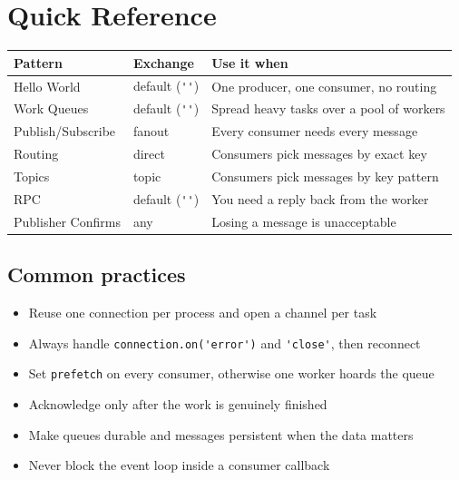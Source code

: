 \documentclass[11pt,a4paper]{article}
\begin{document}
\newpage
\section{Quick Reference}

\begin{table}[h]
\centering
\begin{tabularx}{\textwidth}{@{}llX@{}}
\toprule
\rowcolor{tablehead}
\textbf{\color{accent}Pattern} & \textbf{\color{accent}Exchange} & \textbf{\color{accent}Use it when} \\
\midrule
Hello World        & default (\lstinline|''|) & One producer, one consumer, no routing \\
Work Queues        & default (\lstinline|''|) & Spread heavy tasks over a pool of workers \\
Publish/Subscribe  & fanout                   & Every consumer needs every message \\
Routing            & direct                   & Consumers pick messages by exact key \\
Topics             & topic                    & Consumers pick messages by key pattern \\
RPC                & default (\lstinline|''|) & You need a reply back from the worker \\
Publisher Confirms & any                      & Losing a message is unacceptable \\
\bottomrule
\end{tabularx}
\end{table}

\subsection*{Common practices}

\begin{itemize}\itemsep2pt
  \item Reuse one connection per process and open a channel per task
  \item Always handle \lstinline|connection.on('error')| and \lstinline|'close'|, then reconnect
  \item Set \lstinline|prefetch| on every consumer, otherwise one worker hoards the queue
  \item Acknowledge only after the work is genuinely finished
  \item Make queues durable and messages persistent when the data matters
  \item Never block the event loop inside a consumer callback
\end{itemize}
\end{document}
